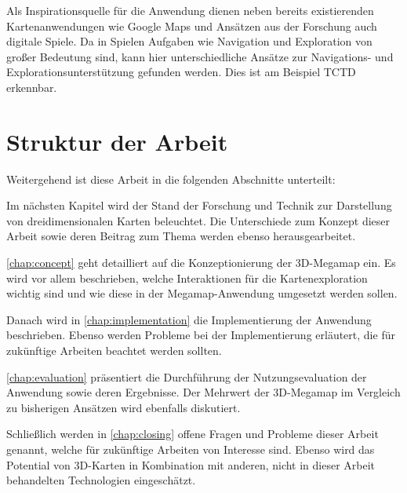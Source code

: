 Als Inspirationsquelle für die Anwendung dienen neben bereits existierenden Kartenanwendungen wie Google Maps und Ansätzen aus der Forschung auch digitale Spiele.
Da in Spielen Aufgaben wie Navigation und Exploration von großer Bedeutung sind, kann hier unterschiedliche Ansätze zur Navigations- und Explorationsunterstützung gefunden werden.
Dies ist am Beispiel TCTD erkennbar.

\section{Struktur der Arbeit}
\label{sec:struktur}
Weitergehend ist diese Arbeit in die folgenden Abschnitte unterteilt:

Im nächsten Kapitel wird der Stand der Forschung und Technik zur Darstellung von dreidimensionalen Karten beleuchtet.
Die Unterschiede zum Konzept dieser Arbeit sowie deren Beitrag zum Thema werden ebenso herausgearbeitet.

\autoref{chap:concept} geht detailliert auf die Konzeptionierung der 3D-Megamap ein.
Es wird vor allem beschrieben, welche Interaktionen für die Kartenexploration wichtig sind und wie diese in der Megamap-Anwendung umgesetzt werden sollen.

Danach wird in \autoref{chap:implementation} die Implementierung der Anwendung beschrieben.
Ebenso werden Probleme bei der Implementierung erläutert, die für zukünftige Arbeiten beachtet werden sollten.

\autoref{chap:evaluation} präsentiert die Durchführung der Nutzungsevaluation der Anwendung sowie deren Ergebnisse.
Der Mehrwert der 3D-Megamap im Vergleich zu bisherigen Ansätzen wird ebenfalls diskutiert.

Schließlich werden in \autoref{chap:closing} offene Fragen und Probleme dieser Arbeit genannt, welche für zukünftige Arbeiten von Interesse sind.
Ebenso wird das Potential von 3D-Karten in Kombination mit anderen, nicht in dieser Arbeit behandelten Technologien eingeschätzt.
%
\cleardoublepage
